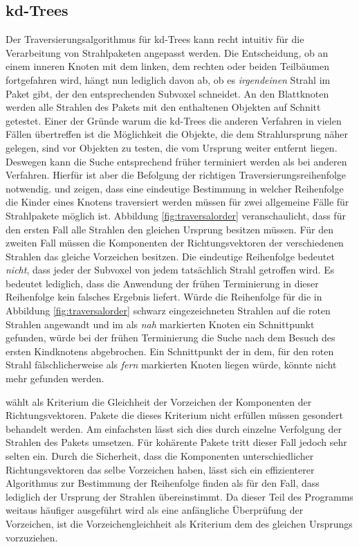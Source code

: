 \subsection{kd-Trees}
\label{sec:kdpacket}
Der Traversierungsalgorithmus für kd-Trees kann recht intuitiv für die Verarbeitung von Strahlpaketen angepasst werden. Die Entscheidung, ob an einem inneren Knoten mit dem linken, dem rechten oder beiden Teilbäumen fortgefahren wird, hängt nun lediglich davon ab, ob es \textit{irgendeinen} Strahl im Paket gibt, der den entsprechenden Subvoxel schneidet. An den Blattknoten werden alle Strahlen des Pakets mit den enthaltenen Objekten auf Schnitt getestet.
Einer der Gründe warum die kd-Trees die anderen Verfahren in vielen Fällen übertreffen ist die Möglichkeit die Objekte, die dem Strahlursprung näher gelegen, sind vor Objekten zu testen, die vom Ursprung weiter entfernt liegen. Deswegen kann die Suche entsprechend früher terminiert werden als bei anderen Verfahren. Hierfür ist aber die Befolgung der richtigen Traversierungsreihenfolge notwendig.
\cite{Wald04} und \cite{Benthin06} zeigen, dass eine eindeutige Bestimmung in welcher Reihenfolge die Kinder eines Knotens traversiert werden müssen für zwei allgemeine Fälle für Strahlpakete möglich ist. Abbildung \ref{fig:traversalorder} veranschaulicht, dass für den ersten Fall alle Strahlen den gleichen Ursprung besitzen müssen. Für den zweiten Fall müssen die Komponenten der Richtungsvektoren der verschiedenen Strahlen das gleiche Vorzeichen besitzen. Die eindeutige Reihenfolge bedeutet \textit{nicht}, dass jeder der Subvoxel von jedem tatsächlich Strahl getroffen wird. Es bedeutet lediglich, dass die Anwendung der frühen Terminierung in dieser Reihenfolge kein falsches Ergebnis liefert. Würde die Reihenfolge für die in Abbildung \ref{fig:traversalorder} schwarz eingezeichneten Strahlen auf die roten Strahlen angewandt und im als \textit{nah} markierten Knoten ein Schnittpunkt gefunden, würde bei der frühen Terminierung die Suche nach dem Besuch des ersten Kindknotens abgebrochen. Ein Schnittpunkt der in dem, für den roten Strahl fälschlicherweise als \textit{fern} markierten Knoten liegen würde, könnte nicht mehr gefunden werden.

\cite{Wald04} wählt als Kriterium die Gleichheit der Vorzeichen der Komponenten der Richtungsvektoren. Pakete die dieses Kriterium nicht erfüllen müssen gesondert behandelt werden. Am einfachsten lässt sich dies durch einzelne Verfolgung der Strahlen des Pakets umsetzen. Für kohärente Pakete tritt dieser Fall jedoch sehr selten ein.
Durch die Sicherheit, dass die Komponenten unterschiedlicher Richtungsvektoren das selbe Vorzeichen haben, lässt sich ein effizienterer Algorithmus zur Bestimmung der Reihenfolge finden als für den Fall, dass lediglich der Ursprung der Strahlen übereinstimmt. Da dieser Teil des Programms weitaus häufiger ausgeführt wird als eine anfängliche Überprüfung der Vorzeichen, ist die Vorzeichengleichheit als Kriterium dem des gleichen Ursprungs vorzuziehen.

